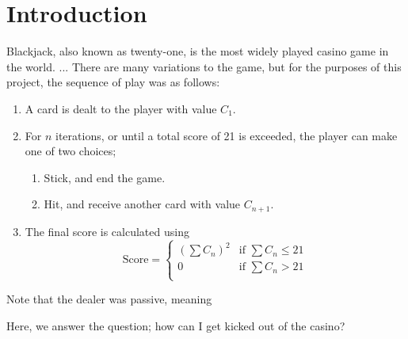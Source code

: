 \section{Introduction}

Blackjack, also known as twenty-one, is the most widely played casino game in the world. ... There are many variations to the game, but for the purposes of this project, the sequence of play was as follows:

\begin{enumerate}
    \item A card is dealt to the player with value \(C_1\).
    \item For \(n\) iterations, or until a total score of 21 is exceeded, the player can make one of two choices;
    \begin{enumerate} 
        \item Stick, and end the game.
        \item Hit, and receive another card with value \(C_{n+1}\).
    \end{enumerate}
    \item The final score is calculated using
        \begin{equation}
            \text{Score} = 
            \begin{cases}
                (\sum C_n)^2 & \text{if } \sum C_n \le 21\\
                0            & \text{if } \sum C_n >   21\\
            \end{cases}
        \end{equation}
\end{enumerate}

Note that the dealer was passive, meaning 


Here, we answer the question; how can I get kicked out of the casino?